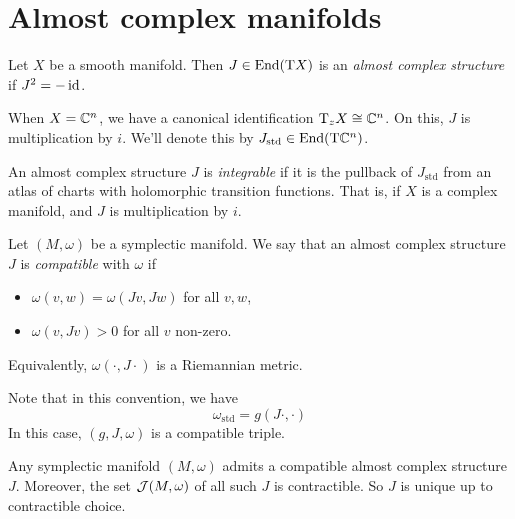 \documentclass{article}
\begin{document}
\lec

\section{Almost complex manifolds}

\begin{definition}
    Let \(X\) be a smooth manifold. Then \(J \in \operatorname{End}(\mathrm{T} X)\) is an \emph{almost complex structure} if \(J^2 = -\operatorname{id}\).
\end{definition}

\begin{example}
    When \(X = \mathbb{C}^n\), we have a canonical identification \(\mathrm{T}_zX \cong \mathbb{C}^n\). On this, \(J\) is multiplication by \(i\). We'll denote this by \(J_{\text{std}} \in \operatorname{End}(\mathrm{T}\mathbb{C}^n)\).
\end{example}

\begin{definition}
    [integrable] An almost complex structure \(J\) is \emph{integrable} if it is the pullback of \(J_{\text{std}}\) from an atlas of charts with holomorphic transition functions. That is, if \(X\) is a complex manifold, and \(J\) is multiplication by \(i\).
\end{definition}

\begin{definition}
    [compatible]
    Let \((M, \omega)\) be a symplectic manifold. We say that an almost complex structure \(J\) is \emph{compatible} with \(\omega\) if
    \begin{itemize}
        \item \(\omega(v, w) = \omega(Jv, Jw)\) for all \(v, w\),
        \item \(\omega(v, Jv) > 0\) for all \(v\) non-zero.
    \end{itemize}
    Equivalently, \(\omega(\cdot, J\cdot)\) is a Riemannian metric.
\end{definition}

Note that in this convention, we have
\[\omega_{\text{std}} = g(J\cdot, \cdot)\]
In this case, \((g, J, \omega)\) is a compatible triple.

\begin{proposition}
    Any symplectic manifold \((M, \omega)\) admits a compatible almost complex structure \(J\). Moreover, the set \(\mathcal{J}(M, \omega)\) of all such \(J\) is contractible. So \(J\) is unique up to contractible choice.
\end{proposition}
\end{document}
